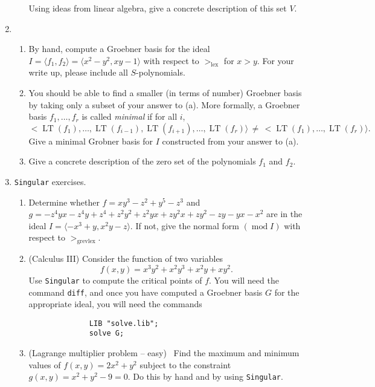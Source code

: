 \documentclass[11pt]{report}
\newcommand\lex{>_{\operatorname{lex}}}
\newcommand\grevlex{>_{\operatorname{grevlex}}}
\newcommand\LT{\operatorname{LT}}
\newcommand\modI{\operatorname{mod} I}
\begin{document}
\begin{enumerate}
\begin{enumerate}
\smallskip

Using ideas from linear algebra, give a concrete description of this set $V$.

\end{enumerate}

\item 

\begin{enumerate}

\item By hand, compute a Groebner basis for the ideal $I = \langle f_1, f_2 \rangle =
\langle x^2-y^2, xy-1 \rangle$ with respect to $\lex$ for $x > y$.
For your write up, please include all $S$-polynomials.

\item You should be able to find a smaller (in terms of number)
Groebner basis by taking only a subset of your answer to (a).  More formally,
a Groebner basis $f_1, \dots, f_r$  is called \emph{minimal} 
if for all $i$, 
$$
< \LT(f_1), \dots, \LT(f_{i-1}), \LT(f_{i+1}), \dots, \LT(f_r)\rangle \, \neq \,
< \LT(f_1), \dots, \LT(f_r)\rangle.
$$
Give a minimal Grobner basis for $I$ constructed from your answer to (a).

\item Give a concrete description of the zero set of the polynomials $f_1$ and $f_2$.  

\end{enumerate}

\item {\tt Singular} exercises.

\begin{enumerate}

\item Determine whether $f = xy^3 -z^2 +y^5-z^3$ and 
$g =-z^4yx-z^4y+z^4+z^2y^2+z^2yx+zy^2x+zy^2-zy-yx-x^2$
are in the ideal $I = \langle -x^3 + y, x^2y-z \rangle$.  If not,
give the normal form $(\modI)$ with respect to 
$\grevlex$.

\item (Calculus III) Consider the function of two variables
$$
f(x,y) = x^3y^2+x^2y^3+x^2y+xy^2.
$$
Use {\tt Singular} to compute the critical points of $f$.  You will
need the command {\tt diff}, and once you have computed a
Groebner basis $G$ for the appropriate ideal, you will need the 
commands
\begin{verbatim}
              LIB "solve.lib";
              solve G;
\end{verbatim}

\item (Lagrange multiplier problem -- easy) \,   Find the maximum and minimum values of
$f(x,y) = 2x^2 + y^2$ subject to the constraint $g(x,y) = x^2 + y^2 - 9 = 0$.  Do this
by hand and by using {\tt Singular}.


\end{enumerate}


\end{enumerate}
\end{document}
